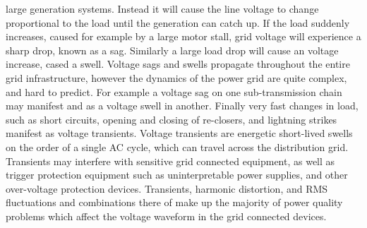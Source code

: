 large generation systems. Instead it will cause the line voltage to change proportional to the load until the generation can catch up. If the load suddenly increases, caused for example by a large motor stall, grid voltage will experience a sharp drop, known as a sag. Similarly a large load drop will cause an voltage increase, cased a swell. Voltage sags and swells propagate throughout the entire grid infrastructure, however the dynamics of the power grid are quite complex, and hard to predict. For example a voltage sag on one sub-transmission chain may manifest and as a voltage swell in another. Finally very fast changes in load, such as short circuits, opening and closing of re-closers, and lightning strikes manifest as voltage transients. Voltage transients are energetic short-lived swells on the order of a single AC cycle, which can travel across the distribution grid. Transients may interfere with sensitive grid connected equipment, as well as trigger protection equipment such as uninterpretable power supplies, and other over-voltage protection devices. Transients, harmonic distortion, and RMS fluctuations and combinations there of make up the majority of power quality problems which affect the voltage waveform in the grid connected devices. \cite{5154067}

